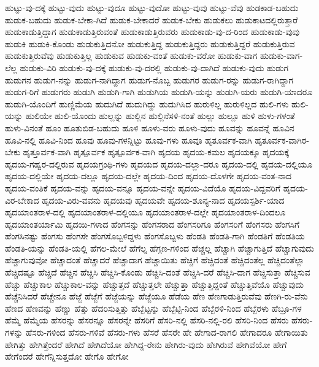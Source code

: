 {ಹುಟ್ಟು-ವು-ದಕ್ಕೆ
ಹುಟ್ಟು-ವುದು
ಹುಟ್ಟು-ವುದೂ
ಹುಟ್ಟು-ವುದೋ
ಹುಟ್ಟು-ವುವು
ಹುಟ್ಟು-ವೆವು
ಹುಡಕಾಡ-ಬಹುದು
ಹುಡುಕ-ಬಹುದು
ಹುಡುಕ-ಬೇಕಾ-ಗಿದೆ
ಹುಡುಕ-ಬೇಕಾದರೆ
ಹುಡುಕ-ಬೇಕು
ಹುಡುಕಲು
ಹುಡುಕಾಟದಲ್ಲಿರುತ್ತಾರೆ
ಹುಡುಕಾಡುತ್ತಿದ್ದಾಗ
ಹುಡುಕಾಡುತ್ತಿರುವಂತೆ
ಹುಡುಕಾಡುತ್ತಿರುವರು
ಹುಡುಕಾಡು-ವು-ದ-ರಿಂದ
ಹುಡುಕಾಡು-ವುವು
ಹುಡುಕಿ
ಹುಡುಕಿ-ಕೊಂಡು
ಹುಡುಕುತ್ತಿದನೋ
ಹುಡುಕುತ್ತಿದ್ದ
ಹುಡುಕುತ್ತಿದ್ದರು
ಹುಡುಕುತ್ತಿದ್ದರೆ
ಹುಡುಕುತ್ತಿರುವ
ಹುಡುಕುತ್ತಿರುವೆವು
ಹುಡುಕುತ್ತಿಲ್ಲ
ಹುಡುಕುವ
ಹುಡುಕು-ವಂತೆ
ಹುಡುಕು-ವರೋ
ಹುಡುಕು-ವಾಗ
ಹುಡುಕು-ವಾಗ-ಲೆಲ್ಲ
ಹುಡುಕು-ವಿರಿ
ಹುಡುಕು-ವು-ದಕ್ಕೆ
ಹುಡುಕು-ವು-ದರಲ್ಲಿ
ಹುಡುಕು-ವು-ದಾಗಿದೆ
ಹುಡುಕು-ವುದು
ಹುಡುಗ
ಹುಡುಗನ
ಹುಡುಗ-ನನ್ನು
ಹುಡುಗ-ನಾಗಿದ್ದಾಗ
ಹುಡುಗ-ನೊಬ್ಬ
ಹುಡುಗರ
ಹುಡುಗ-ರನ್ನು
ಹುಡುಗ-ರಾಗಿದ್ದಾಗ
ಹುಡುಗ-ರಿಗೆ
ಹುಡುಗರು
ಹುಡುಗಿ
ಹುಡುಗಿ-ಗಾಗಿ
ಹುಡುಗಿಯ
ಹುಡುಗಿ-ಯನ್ನು
ಹುಡುಗಿ-ಯರು
ಹುಡುಗಿ-ಯಾದರೂ
ಹುಡುಗಿ-ಯೊಂದಿಗೆ
ಹುಣ್ಣಿಮೆಯ
ಹುದುಗಿದೆ
ಹುದುಗಿದ್ದು
ಹುದುಗಿಸಿದ
ಹುರುಳಿಲ್ಲ
ಹುರುಳಿಲ್ಲದ
ಹುಲಿ-ಗಳು
ಹುಲಿ-ಯನ್ನು
ಹುಲಿಯೇ
ಹುಲಿ-ಯೊಂದು
ಹುಲ್ಲನ್ನು
ಹುಲ್ಲಿನ
ಹುಲ್ಲಿನೆಸಳಿ-ನಂತೆ
ಹುಲ್ಲು
ಹುಲ್ಲೂ
ಹುಳಿ
ಹುಳು-ಗಳಂತೆ
ಹುಳು-ವಿನಂತೆ
ಹೂಂ
ಹೂತುಬಿಡ-ಬಹುದು
ಹೂಳಿ
ಹೂಳು-ವರು
ಹೂಳು-ವುದು
ಹೂವನ್ನು
ಹೂವನ್ನೆ
ಹೂವಿನ
ಹೂವಿ-ನಲ್ಲಿ
ಹೂವಿ-ನಿಂದ
ಹೂವು
ಹೂವು-ಗಳನ್ನಿಟ್ಟು
ಹೂವು-ಗಳು
ಹೂವೂ
ಹೃತೂರ್ವಕ-ವಾಗಿ
ಹೃತೂರ್ವಕ-ವಾಗಿರ-ಬೇಕು
ಹೃತ್ತೂರ್ವಕ-ವಾಗಿ
ಹೃತ್ಪೂರ್ವಕ
ಹೃತ್ಪೂರ್ವಕ-ವಾಗಿ
ಹೃದಯ
ಹೃದಯ-ಕಮಲ
ಹೃದಯಕ್ಕೂ
ಹೃದಯಕ್ಕೆ
ಹೃದಯ-ಗಹ್ವರ-ದಲ್ಲಿರುವ
ಹೃದಯಗ್ರಂಥಿ-ಗಳು
ಹೃದಯದ
ಹೃದಯ-ದಲ್ಲಾ-ದರೂ
ಹೃದಯ-ದಲ್ಲಿ
ಹೃದಯ-ದಲ್ಲಿಯೂ
ಹೃದಯ-ದಲ್ಲಿಯೇ
ಹೃದಯ-ದಲ್ಲೂ
ಹೃದಯ-ದಲ್ಲೇ
ಹೃದಯ-ದಿಂದ
ಹೃದಯ-ದೊಳಗೇ
ಹೃದಯ-ವಂತ-ನಾದ
ಹೃದಯ-ವಂತಿಕೆ
ಹೃದಯ-ವನ್ನು
ಹೃದಯ-ವನ್ನೂ
ಹೃದಯ-ವನ್ನೇ
ಹೃದಯ-ವಿದೆಯೊ
ಹೃದಯ-ವಿದ್ದವರಿಗೆ
ಹೃದಯ-ವಿರ-ಬೇಕಾದ
ಹೃದಯ-ವಿರು-ವವನು
ಹೃದಯವು
ಹೃದಯವೇ
ಹೃದಯ-ಶೂನ್ಯ-ನಾದ
ಹೃದಯಸ್ಪರ್ಶಿ-ಯಾದ
ಹೃದಯಾಂತರಾಳ-ದಲ್ಲಿ
ಹೃದಯಾಂತರಾಳ-ದಲ್ಲಿಯೂ
ಹೃದಯಾಂತರಾಳ-ದಲ್ಲೇ
ಹೃದಯಾಂತರಾಳ-ದಿಂದಲೂ
ಹೃದಯಾಂತರ್ಯಾಮಿ
ಹೃದಯಿ-ಗಳಾದ
ಹೆಂಗಸನ್ನು
ಹೆಂಗಸರಾದ
ಹೆಂಗಸರಿಗೂ
ಹೆಂಗಸರಿಗೆ
ಹೆಂಗಸರು
ಹೆಂಗಸಿಗೆ
ಹೆಂಗಸಿನಷ್ಟು
ಹೆಂಗಸು
ಹೆಂಗಸೇ
ಹೆಂಗಸೊಬ್ಬಳಿದ್ದಳು
ಹೆಂಗಸೊಬ್ಬಳು
ಹೆಂಡತಿ
ಹೆಂಡತಿ-ಗಾಗಿ
ಹೆಂಡತಿಗೆ
ಹೆಂಡತಿಯ
ಹೆಂಡತಿ-ಯನ್ನು
ಹೆಂಡತಿ-ಯಲ್ಲಿ
ಹೆಗಲ-ಮೇಲೆ
ಹೆಗೆಲ್ನ
ಹೆಗ್ಗಣ-ಗಳಿಂದ
ಹೆಚ್ಚಲ್ಲ
ಹೆಚ್ಚಾಗಿ
ಹೆಚ್ಚಾಗುತ್ತಿದೆ
ಹೆಚ್ಚಾಗುವುದು
ಹೆಚ್ಚಾಗುವುವೋ
ಹೆಚ್ಚಾದಂತೆ
ಹೆಚ್ಚಾದರೆ
ಹೆಚ್ಚಾದಾಗ
ಹೆಚ್ಚಾಯಿತು
ಹೆಚ್ಚಿಗೆ
ಹೆಚ್ಚಿದಂತೆ
ಹೆಚ್ಚಿದಂತೆಲ್ಲ
ಹೆಚ್ಚಿದಂತೆಲ್ಲಾ
ಹೆಚ್ಚಿದಷ್ಟೂ
ಹೆಚ್ಚಿದೆ
ಹೆಚ್ಚಿನ
ಹೆಚ್ಚಿಸಿ
ಹೆಚ್ಚಿಸಿ-ಕೊಂಡು
ಹೆಚ್ಚಿಸಿ-ದಂತೆ
ಹೆಚ್ಚಿಸಿ-ದರೆ
ಹೆಚ್ಚಿಸಿ-ದಾಗ
ಹೆಚ್ಚಿಸುತ್ತಾ
ಹೆಚ್ಚಿಸುವ
ಹೆಚ್ಚು
ಹೆಚ್ಚುಕಾಲ
ಹೆಚ್ಚುಕಾಲ-ವನ್ನು
ಹೆಚ್ಚುತ್ತದೆ
ಹೆಚ್ಚುತ್ತಲೇ
ಹೆಚ್ಚುತ್ತಾ
ಹೆಚ್ಚುತ್ತಿದ್ದಂತೆ
ಹೆಚ್ಚುತ್ತಿವೆಯೊ
ಹೆಚ್ಚುವುದು
ಹೆಚ್ಚೆನಿಸಿದರೆ
ಹೆಚ್ಚೇನೂ
ಹೆಜ್ಜೆ
ಹೆಜ್ಜೆಗೆ
ಹೆಜ್ಜೆಯನ್ನು
ಹೆಜ್ಜೆಯೂ
ಹೆಡೆಯ
ಹೆಣ
ಹೆಣಗಾಡುತ್ತಿರುವೆವು
ಹೆಣಗಿ-ರು-ವೆನು
ಹೆಣದ
ಹೆಣವನ್ನು
ಹೆಣ್ಣು
ಹೆತ್ತು
ಹೆದರಿಸುತ್ತಿತ್ತು
ಹೆಬ್ಬೆಟ್ಟನ್ನು
ಹೆಬ್ಬೆಟ್ಟಿ-ನಿಂದ
ಹೆಬ್ಬೆರಳಿ-ನಿಂದ
ಹೆಬ್ಬೆರಳು
ಹೆಬ್ರೂ-ಗಳ
ಹೆಮ್ಮೆ
ಹೆಮ್ಮೆಯ
ಹೆಸರನ್ನು
ಹೆಸರನ್ನೂ
ಹೆಸರನ್ನೇ
ಹೆಸರಿಗೆ
ಹೆಸರಿ-ನಲ್ಲಿ
ಹೆಸರಿ-ನಲ್ಲಿ-ರಲಿ
ಹೆಸರಿ-ನಿಂದ
ಹೆಸರು
ಹೆಸರು-ಗಳನ್ನು
ಹೆಸರು-ಗಳಿಂದ
ಹೆಸರು-ಗಳಿವೆ
ಹೆಸರು-ಗಳು
ಹೆಸರೆ
ಹೆಸರೇ
ಹೇ
ಹೇಗಾದ-ರಾಗಲಿ
ಹೇಗಾದರೂ
ಹೇಗಾಯಿತು
ಹೇಗಿತ್ತು
ಹೇಗಿತ್ತೆಂದರೆ
ಹೇಗಿದೆ
ಹೇಗಿದೆಯೋ
ಹೇಗಿದ್ದ-ರೇನು
ಹೇಗಿರು-ವುದು
ಹೇಗಿರುವೆ
ಹೇಗಿವೆಯೋ
ಹೇಗೆ
ಹೇಗೆಂದರೆ
ಹೇಗೆನ್ನಿಸುತ್ತದೋ
ಹೇಗೊ
ಹೇಗೋ
}
